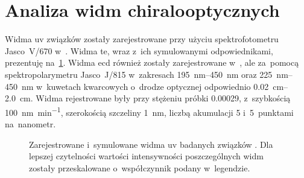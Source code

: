 \section{Analiza widm chiralooptycznych}\label{experimental:spectra}

Widma \gls{uv} związków  zostały zarejestrowane przy użyciu
  spektrofotometru Jasco~V\-/670 w~.
Widma te, wraz z~ich symulowanymi odpowiednikami, prezentuję na~\cref{fig:spectra-uv}.
Widma \gls{ecd} również zostały zarejestrowane w~, ale za~pomocą spektropolarymetru
  Jasco~J\-/815 w~zakresach \SIrange{195}{450}{\nano\meter} oraz \SIrange{225}{450}{\nano\meter}
  w~kuwetach kwarcowych o~drodze optycznej odpowiednio \SIrange{0.02}{2.0}{\centi\meter}.
Widma rejestrowane były przy stężeniu próbki \SI{0.00029}{\molar},
  z~szybkością \SI{100}{\nm\per\minute}, szerokością szczeliny \SI{1}{\nm}, liczbą akumulacji 5
  i~5~punktami na~nanometr.

\begin{figure}

  \caption{
    Zarejestrowane i~symulowane widma \gls{uv} badanych związków
      .
    Dla lepszej czytelności wartości intensywności poszczególnych widm zostały przeskalowane
      o~współczynnik podany w~legendzie.
  }
  \label{fig:spectra-uv}
\end{figure}

